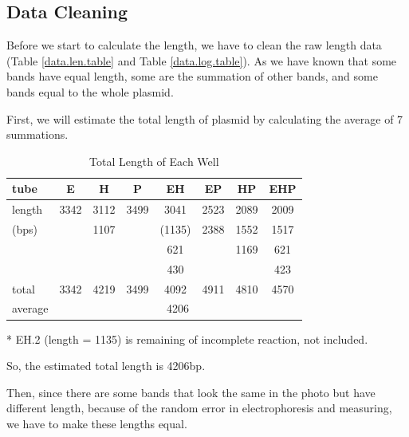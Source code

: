 \documentclass{article}
\begin{document}
        \subsection{Data Cleaning}
            Before we start to calculate the length, we have to clean the raw length data (Table \ref{data.len.table} and Table \ref{data.log.table}). As we have known that some bands have equal length, some are the summation of other bands, and some bands equal to the whole plasmid.

            First, we will estimate the total length of plasmid by calculating the average of 7 summations.
            \begin{table}[H]
                \centering
                \caption{Total Length of Each Well}
                \begin{threeparttable}
                    \begin{tabular}{|l|c|c|c|c|c|c|c|}
                        \hline
                        tube&E&H&P&EH&EP&HP&EHP\\
                        \hline
                        length&3342&3112&3499&3041&2523&2089&2009\\
                        (bps)&&1107&&(1135)&2388&1552&1517\\
                        &&&&621&&1169&621\\
                        &&&&430&&&423\\
                        \hline
                        total&3342&4219&3499&4092\tnote{*}&4911&4810&4570\\
                        \hline
                        average&\multicolumn{7}{|c|}{4206}\\
                        \hline
                    \end{tabular}
                    \begin{tablenotes}
                        \footnotesize
                        \item[*] EH.2 (length = 1135) is remaining of incomplete reaction, not included.
                    \end{tablenotes}
                \end{threeparttable}
                \label{data.len.table.total}
            \end{table}

            So, the estimated total length is 4206bp.

            Then, since there are some bands that look the same in the photo but have different length, because of the random error in electrophoresis and measuring, we have to make these lengths equal.
\end{document}
